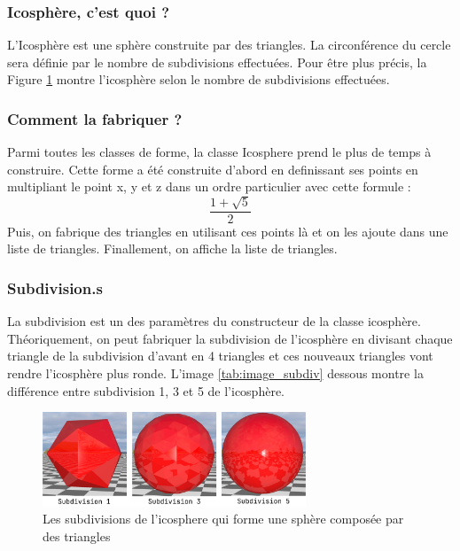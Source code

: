 \documentclass[12pt]{article}
\begin{document}
\subsubsection{Icosphère, c'est quoi ?}
L'Icosphère est une sphère construite par des triangles. La circonférence du cercle sera définie par le nombre de subdivisions effectuées. Pour être plus précis, la Figure \ref{fig:image_subdiv} montre l'icosphère selon le nombre de subdivisions effectuées.

\subsubsection{Comment la fabriquer ?}
Parmi toutes les classes de forme, la classe Icosphere prend le plus de temps à construire. 
Cette forme a été construite d'abord en definissant ses points en multipliant le point x, y et z dans un ordre particulier avec cette formule :
$$\frac{1+\sqrt{5}}{2}$$
Puis, on fabrique des triangles en utilisant ces points là et on les ajoute dans une liste de triangles.
Finallement, on affiche la liste de triangles.

\subsubsection{Subdivision.s}
La subdivision est un des paramètres du constructeur de la classe icosphère.
Théoriquement, on peut fabriquer la subdivision de l'icosphère en divisant chaque triangle de la subdivision d'avant en 4 triangles et ces nouveaux triangles vont rendre l'icosphère plus ronde.
L'image \ref{tab:image_subdiv} dessous montre la différence entre subdivision 1, 3 et 5 de l'icosphère.

\begin{figure}[ht]
  \begin{center}
    \includegraphics[width=0.7\textwidth]{./img/formes/subdivicosp.png} 
  \caption{Les subdivisions de l'icosphere qui forme une sphère composée par des triangles}
  \label{fig:image_subdiv}
\end{center}
\end{figure}
\FloatBarrier
\end{document}
